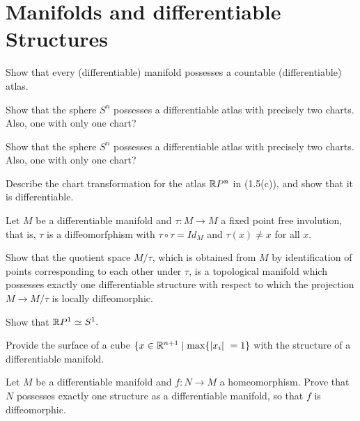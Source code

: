 \chapter{Manifolds and differentiable Structures}

\begin{problem}{1}
Show that every (differentiable) manifold possesses a countable (differentiable) atlas.
\end{problem}

\begin{problem}{2}
Show that the sphere $S^n$ possesses a differentiable atlas with precisely two charts. Also, one with only one chart?
\end{problem}



\begin{problem}{2}
Show that the sphere $S^n$ possesses a differentiable atlas with precisely two charts. Also, one with only one chart?
\end{problem}


\begin{problem}{3}
Describe the chart transformation for the atlas $\mathbb{R} P^n$ in (1.5(c)), and show that it is differentiable.
\end{problem}


\begin{problem}{4}
Let $M$ be a differentiable manifold and $\tau: M \rightarrow M$ a fixed point free involution, that is, $\tau$ is a diffeomorfphism with $\tau \circ \tau = Id_M$ and $\tau(x) \neq x$ for all $x.$ 

Show that the quotient space $M/\tau$, which is obtained from $M$ by identification of points corresponding to each other under $\tau$, is a topological manifold which possesses exactly one differentiable structure with respect to which the projection $M \rightarrow M/\tau$ is locally diffeomorphic.
\end{problem}


\begin{problem}{5}
Show that $\mathbb{R} P^1 \simeq S^1.$
\end{problem}

\begin{problem}{6}
Provide the surface of a cube $\{x\in \mathbb{R}^{n+1} \mid \max \{\lvert x_i \rvert\ = 1 \}$ with the structure of a differentiable manifold. 
\end{problem}

\begin{problem}{7}
Let $M$ be a differentiable manifold and $f: N \rightarrow M$ a homeomorphism. Prove that $N$ possesses exactly one structure as a differentiable manifold, so that $f$ is diffeomorphic.
\end{problem}


